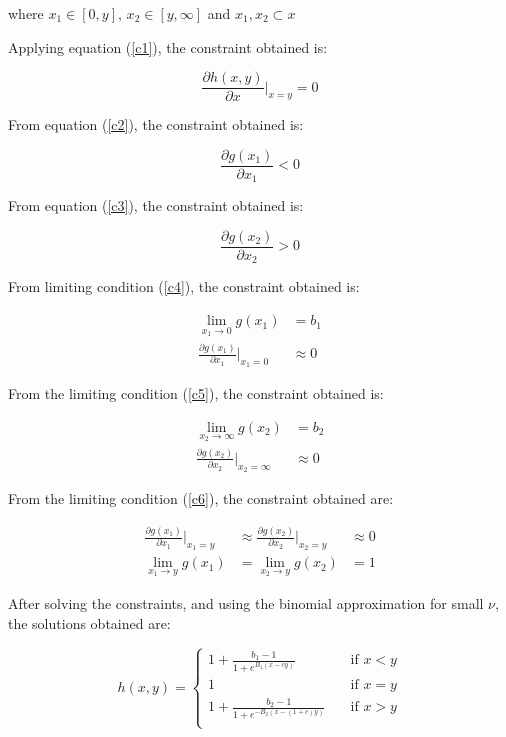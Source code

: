 \documentclass[11pt]{article}
\newcommand{\at}[2][]{#1|_{#2}}
\begin{document}
	where $x_1 \in [0, y]$, $x_2 \in [y, \infty]$ and $x_1, x_2 \subset x$
	
	Applying equation (\ref{c1}), the constraint obtained is:
	
	\begin{equation*}
		\frac{\partial h(x, y)}{\partial x}\at[\bigg]{x=y} = 0
	\end{equation*}
	
	From equation (\ref{c2}), the constraint obtained is:
	
	\begin{equation*}
		\frac{\partial g(x_1)}{\partial x_1} < 0
	\end{equation*}
	
	From equation (\ref{c3}), the constraint obtained is:
	
	\begin{equation*}
		\frac{\partial g(x_2)}{\partial x_2} > 0
	\end{equation*}
	
	
	From limiting condition (\ref{c4}), the constraint obtained is: 
	
	\begin{align*}
		\lim_{x_1 \to 0} g(x_1) &= b_1 \\
		\frac{\partial g(x_1)}{\partial x_1}\at[\bigg]{x_1 = 0} &\approx 0
	\end{align*}
	
	From the limiting condition (\ref{c5}), the constraint obtained is: 
	
	\begin{align*}
		\lim_{x_2 \to \infty} g(x_2) &= b_2 \\
		\frac{\partial g(x_2)}{\partial x_2}\at[\bigg]{x_2 = \infty} &\approx 0
	\end{align*}
	
	From the limiting condition (\ref{c6}), the constraint obtained are: 
	
	\begin{align*}
		\frac{\partial g(x_1)}{\partial x_1}\at[\bigg]{x_1 = y} &\approx \frac{\partial g(x_2)}{\partial x_2}\at[\bigg]{x_2 = y} &\approx 0  \\
		\lim_{x_1 \to y} g(x_1) &= \lim_{x_2 \to y} g(x_2) &= 1 
	\end{align*}
	
	After solving the constraints, and using the binomial approximation for small $\nu$, the solutions obtained are:
	
	\begin{equation}
		h(x, y) = 
		\begin{cases}
			1 + \frac{b_1 - 1}{1 + e^{B_1(x - cy)}}       & \quad \text{if } x < y\\
			1 & \quad \text{if } x = y\\
			1 + \frac{b_2 - 1}{1 + e^{-B_2(x - (1 + c)y)}}  & \quad \text{if } x > y\\
		\end{cases}
	\end{equation}
	
\end{document}
